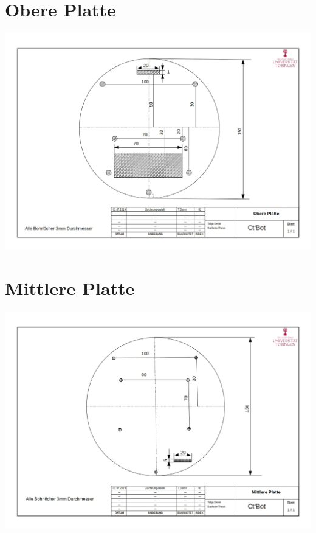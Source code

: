 \documentclass[twoside,11pt, a4paper]{report}
\begin{document}
	\section{Obere Platte}
	\includegraphics[angle=90,origin=c, scale= 0.5]{images/Zeichnung_obere_Platte.jpg}
	\section{Mittlere Platte}
	\includegraphics[angle=90,origin=c, scale= 0.7]{images/Zeichnung_mittlere_Platte.jpg}
\end{document}

